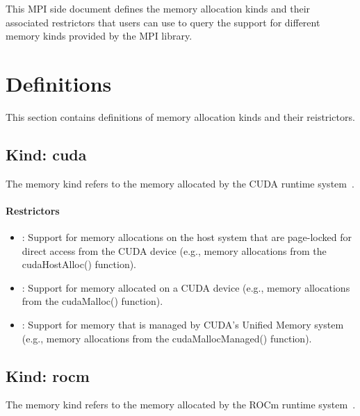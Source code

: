 This MPI side document defines the memory allocation kinds and their
associated restrictors that users can use to query the support for
different memory kinds provided by the MPI library.

\chapter{Definitions}

This section contains definitions of memory allocation kinds and
their reistrictors.

\section{Kind: cuda}

The  memory kind refers to the memory allocated by the
CUDA runtime system~\cite{cudaref}.

\subsubsection{Restrictors}

\begin{itemize}

\item {}: Support for memory allocations on the host system
    that are page-locked for direct access from the CUDA device (e.g.,
        memory allocations from the cudaHostAlloc() function).

\item {}: Support for memory allocated on a CUDA device
    (e.g., memory allocations from the cudaMalloc() function).

\item {}: Support for memory that is managed by CUDA’s
    Unified Memory system (e.g., memory allocations from the
        cudaMallocManaged() function).

\end{itemize}

\section{Kind: rocm}

The  memory kind refers to the memory allocated by the ROCm
runtime system~\cite{rocmref}.

